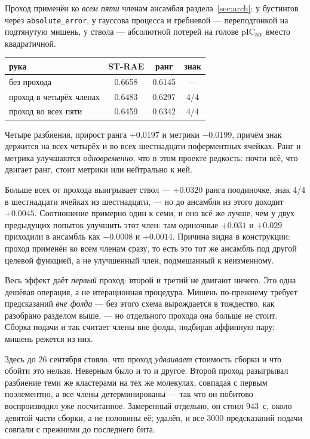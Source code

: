 Проход применён ко \emph{всем пяти} членам ансамбля раздела~\ref{sec:arch}: у бустингов через
\texttt{absolute\_error}, у гауссова процесса и гребневой --- переподгонкой на подтянутую мишень, у
ствола --- абсолютной потерей на голове $\mathrm{pIC}_{50}$ вместо квадратичной.

\begin{center}
\begin{tabular}{lccc}
\toprule
рука & ST-RAE & ранг & знак \\
\midrule
без прохода                & 0.6658 & 0.6145 & --- \\
проход в четырёх членах    & 0.6483 & 0.6297 & 4/4 \\
проход во всех пяти        & 0.6459 & 0.6342 & 4/4 \\
\bottomrule
\end{tabular}
\end{center}

Четыре разбиения, прирост ранга $+0.0197$ и метрики $-0.0199$, причём знак держится на всех четырёх
и во всех шестнадцати поферментных ячейках. Ранг и метрика улучшаются \emph{одновременно}, что в
этом проекте редкость: почти всё, что двигает ранг, стоит метрики или нейтрально к ней.

Больше всех от прохода выигрывает ствол --- $+0.0320$ ранга поодиночке, знак 4/4 в шестнадцати
ячейках из шестнадцати, --- но до ансамбля из этого доходит $+0.0045$. Соотношение примерно один к
семи, и оно всё же лучше, чем у двух предыдущих попыток улучшить этот член: там одиночные $+0.031$ и
$+0.029$ приходили в ансамбль как $-0.0008$ и $+0.0014$. Причина видна в конструкции: проход
применён ко всем членам сразу, то есть это тот же ансамбль под другой целевой функцией, а не
улучшенный член, подмешанный к неизменному.

Весь эффект даёт \emph{первый} проход: второй и третий не двигают ничего. Это одна дешёвая операция,
а не итерационная процедура. Мишень по-прежнему требует предсказаний \emph{вне фолда} --- без этого
схема вырождается в тождество, как разобрано разделом выше, --- но отдельного прохода она больше не
стоит. Сборка подачи и так считает члены вне фолда, подбирая аффинную пару; мишень режется из них.

Здесь до 26 сентября стояло, что проход \emph{удваивает} стоимость сборки и что обойти это нельзя.
Неверным было и то и другое. Второй проход разыгрывал разбиение теми же кластерами на тех же
молекулах, совпадая с первым поэлементно, а все члены детерминированы --- так что он побитово
воспроизводил уже посчитанное. Замеренный отдельно, он стоил $943$~с, около девятой части сборки, а
не половины её; удалён, и все $3000$ предсказаний подачи совпали с прежними до последнего бита.

